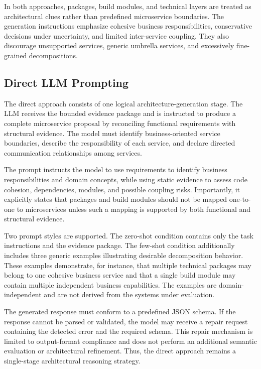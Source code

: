 \documentclass[acmsmall,screen,anonymous,review]{acmart}
\begin{document}
In both approaches, packages, build modules, and technical layers are treated as architectural clues rather than predefined microservice boundaries. The generation instructions emphasize cohesive business responsibilities, conservative decisions under uncertainty, and limited inter-service coupling. They also discourage unsupported services, generic umbrella services, and excessively fine-grained decompositions.

\subsection{Direct LLM Prompting}

The direct approach consists of one logical architecture-generation stage. The LLM receives the bounded evidence package and is instructed to produce a complete microservice proposal by reconciling functional requirements with structural evidence. The model must identify business-oriented service boundaries, describe the responsibility of each service, and declare directed communication relationships among services.

The prompt instructs the model to use requirements to identify business responsibilities and domain concepts, while using static evidence to assess code cohesion, dependencies, modules, and possible coupling risks. Importantly, it explicitly states that packages and build modules should not be mapped one-to-one to microservices unless such a mapping is supported by both functional and structural evidence.

Two prompt styles are supported. The zero-shot condition contains only the task instructions and the evidence package. The few-shot condition additionally includes three generic examples illustrating desirable decomposition behavior. These examples demonstrate, for instance, that multiple technical packages may belong to one cohesive business service and that a single build module may contain multiple independent business capabilities. The examples are domain-independent and are not derived from the systems under evaluation.

The generated response must conform to a predefined JSON schema. If the response cannot be parsed or validated, the model may receive a repair request containing the detected error and the required schema. This repair mechanism is limited to output-format compliance and does not perform an additional semantic evaluation or architectural refinement. Thus, the direct approach remains a single-stage architectural reasoning strategy.
\end{document}
